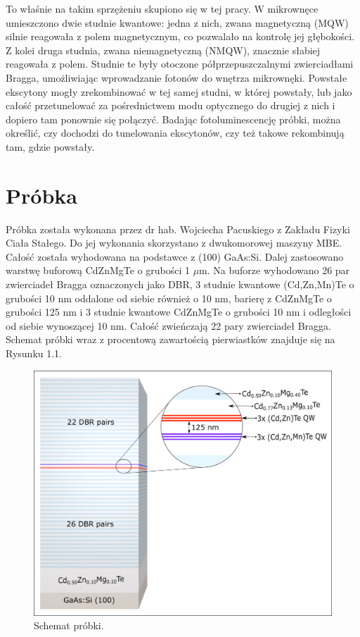 \documentclass[licencjacka]{pracamgr}
\begin{document}
 To właśnie na takim sprzężeniu skupiono się w tej pracy. W mikrownęce umieszczono dwie studnie kwantowe: jedna z nich, zwana magnetyczną (MQW) silnie reagowała z polem magnetycznym, co pozwalało na kontrolę jej głębokości. Z kolei druga studnia, zwana niemagnetyczną (NMQW), znacznie słabiej reagowała z polem. Studnie te były otoczone półprzepuszczalnymi zwierciadłami Bragga, umożliwiając wprowadzanie fotonów do wnętrza mikrownęki. Powstałe ekscytony mogły zrekombinować w tej samej studni, w której powstały, lub jako całość przetunelować za pośrednictwem modu optycznego do drugiej z nich i dopiero tam ponownie się połączyć. Badając fotoluminescencję próbki, można określić, czy dochodzi do tunelowania ekscytonów, czy też takowe rekombinują tam, gdzie powstały.

\chapter{Próbka}\label{r:probka}
Próbka została wykonana przez dr hab. Wojciecha Pacuskiego z Zakładu Fizyki Ciała Stałego. Do jej wykonania skorzystano z dwukomorowej maszyny MBE. Całość została wyhodowana na podstawce z (100) GaAs:Si. Dalej zastosowano warstwę buforową CdZnMgTe o grubości 1 $\mu$m. Na buforze wyhodowano 26 par zwierciadeł Bragga oznaczonych jako DBR, 3 studnie kwantowe (Cd,Zn,Mn)Te o grubości 10 nm oddalone od siebie również o 10 nm, barierę z CdZnMgTe o grubości 125 nm i 3 studnie kwantowe CdZnMgTe o grubości 10 nm i odległości od siebie wynoszącej 10 nm. Całość zwieńczają 22 pary zwierciadeł Bragga. Schemat próbki wraz z procentową zawartością pierwiastków znajduje się na Rysunku 1.1.

\begin{figure}[h!]
\includegraphics[width=13cm]{Probka} 
\centering
\caption{Schemat próbki.}
\end{figure}
\end{document}

